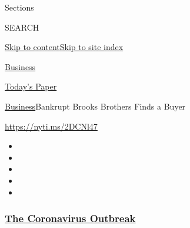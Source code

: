 Sections

SEARCH

\protect\hyperlink{site-content}{Skip to
content}\protect\hyperlink{site-index}{Skip to site index}

\href{https://www.nytimes3xbfgragh.onion/section/business}{Business}

\href{https://myaccount.nytimes3xbfgragh.onion/auth/login?response_type=cookie\&client_id=vi}{}

\href{https://www.nytimes3xbfgragh.onion/section/todayspaper}{Today's
Paper}

\href{/section/business}{Business}\textbar{}Bankrupt Brooks Brothers
Finds a Buyer

\url{https://nyti.ms/2DCNl47}

\begin{itemize}
\item
\item
\item
\item
\item
\end{itemize}

\hypertarget{the-coronavirus-outbreak}{%
\subsubsection{\texorpdfstring{\href{https://www.nytimes3xbfgragh.onion/news-event/coronavirus?name=styln-coronavirus-markets\&region=TOP_BANNER\&block=storyline_menu_recirc\&action=click\&pgtype=Article\&impression_id=634a6850-f1ca-11ea-b7a9-a937f3428503\&variant=undefined}{The
Coronavirus
Outbreak}}{The Coronavirus Outbreak}}\label{the-coronavirus-outbreak}}

